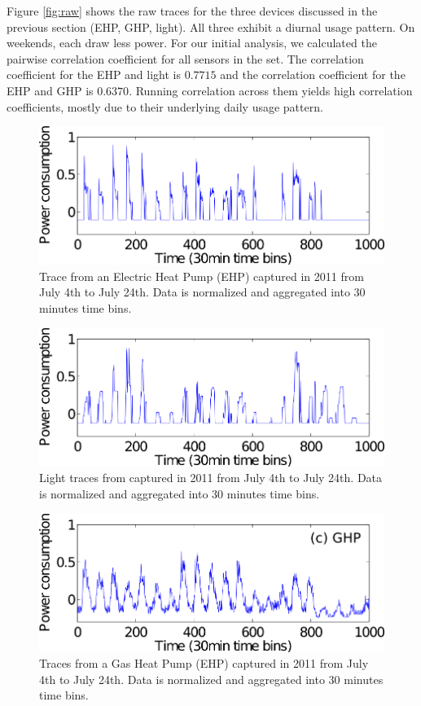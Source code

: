 Figure \ref{fig:raw} shows the raw traces for the three devices discussed in 
the previous section (EHP, GHP, light). All three exhibit a diurnal usage pattern.  On weekends, each
draw less power.   For our initial analysis, we calculated the pairwise 
correlation coefficient for all sensors in the set.  The correlation coefficient for 
 the EHP and light is $0.7715$ and the correlation coefficient for the EHP and GHP is $0.6370$.
Running correlation across them yields high correlation coefficients, mostly
due to their underlying daily usage pattern.



\begin{figure}[ht!]
\centering
	\includegraphics[width=.4\textwidth]{figs/25.png}
\caption{Trace from an Electric Heat Pump (EHP) captured in 2011 from July 4th to July 24th. Data is 
normalized and aggregated into 30 minutes time bins.}
\label{fig:raw_ehp}
\end{figure}

\begin{figure}[ht!]
\centering
	\includegraphics[width=.4\textwidth]{figs/26.png}
\caption{Light traces from captured in 2011 from July 4th to July 24th. Data is 
normalized and aggregated into 30 minutes time bins.}
\label{fig:raw_light}
\end{figure}

\begin{figure}[ht!]
\centering
	\includegraphics[width=.4\textwidth]{figs/41.png}
\caption{Traces from a Gas Heat Pump (EHP) captured in 2011 from July 4th to July 24th. Data is 
normalized and aggregated into 30 minutes time bins.}
\label{fig:raw_ghp}
\end{figure}

